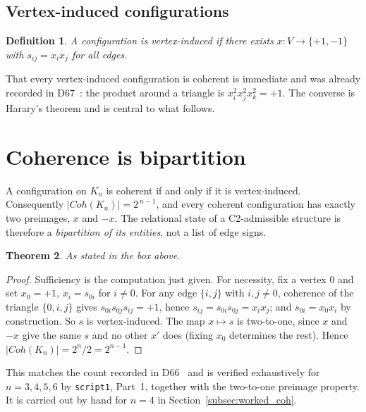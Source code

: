 \documentclass[11pt,a4paper]{article}
\def\mathrm#1{#1}%
\newtheorem{theorem}{Theorem}[section]
\newtheorem{definition}[theorem]{Definition}
\newcommand{\Kn}{K_n}
\newcommand{\Coh}{\mathrm{Coh}}
\begin{document}
\subsection{Vertex-induced configurations}

\begin{definition}
A configuration is \emph{vertex-induced} if there exists $x:V\to\{+1,-1\}$ with $s_{ij}=x_ix_j$ for all edges.
\end{definition}

That every vertex-induced configuration is coherent is immediate and was already recorded in D67~\citep{D67}: the product around a triangle is $x_i^2x_j^2x_k^2=+1$. The converse is Harary's theorem and is central to what follows.

\section{Coherence is bipartition}
\label{sec:bipartition}

\begin{theorembox}
A configuration on $\Kn$ is coherent if and only if it is vertex-induced. Consequently $|\Coh(\Kn)|=2^{\,n-1}$, and every coherent configuration has exactly two preimages, $x$ and $-x$. The relational state of a C2-admissible structure is therefore a \emph{bipartition of its entities}, not a list of edge signs.
\end{theorembox}

\begin{theorem}
\label{thm:bipartition}
As stated in the box above.
\end{theorem}

\begin{proof}
Sufficiency is the computation just given. For necessity, fix a vertex $0$ and set $x_0=+1$, $x_i=s_{0i}$ for $i\neq0$. For any edge $\{i,j\}$ with $i,j\neq0$, coherence of the triangle $\{0,i,j\}$ gives $s_{0i}s_{0j}s_{ij}=+1$, hence $s_{ij}=s_{0i}s_{0j}=x_ix_j$; and $s_{0i}=x_0x_i$ by construction. So $s$ is vertex-induced. The map $x\mapsto s$ is two-to-one, since $x$ and $-x$ give the same $s$ and no other $x'$ does (fixing $x_0$ determines the rest). Hence $|\Coh(\Kn)|=2^n/2=2^{n-1}$.
\end{proof}

This matches the count recorded in D66~\citep{D66} and is verified exhaustively for $n=3,4,5,6$ by \texttt{script1}, Part~1, together with the two-to-one preimage property. It is carried out by hand for $n=4$ in Section~\ref{subsec:worked_coh}.
\end{document}
